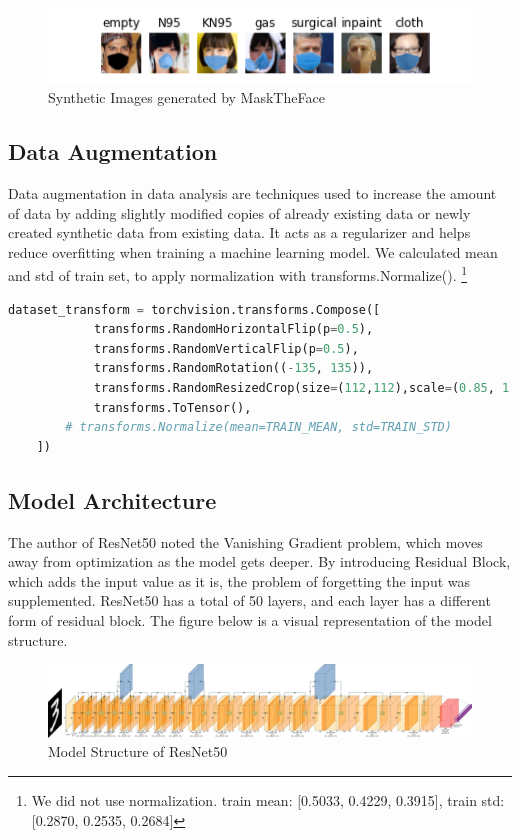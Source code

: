 \documentclass{article}
\begin{document}
\begin{figure}[H]
	\centering
	\includegraphics[scale=0.8]{images/mask_images.png}
	\caption{Synthetic Images generated by MaskTheFace}
\end{figure}

\subsection{Data Augmentation}
Data augmentation in data analysis are techniques used to increase the amount of data by adding slightly modified copies of already existing data or newly created synthetic data from existing data.
It acts as a regularizer and helps reduce overfitting when training a machine learning model. We calculated mean and std of train set, to apply normalization with transforms.Normalize().
\footnote[2] {We did not use normalization. train mean: [0.5033, 0.4229, 0.3915], train std: [0.2870, 0.2535, 0.2684]}

\begin{lstlisting}[language=Python]
    dataset_transform = torchvision.transforms.Compose([
            transforms.RandomHorizontalFlip(p=0.5),
            transforms.RandomVerticalFlip(p=0.5),
            transforms.RandomRotation((-135, 135)),
            transforms.RandomResizedCrop(size=(112,112),scale=(0.85, 1.0)),
            transforms.ToTensor(),
	    # transforms.Normalize(mean=TRAIN_MEAN, std=TRAIN_STD)
    ])
\end{lstlisting}

\subsection{Model Architecture}
The author of ResNet50 noted the Vanishing Gradient problem, which moves away from optimization as the model gets deeper.
By introducing Residual Block, which adds the input value as it is, the problem of forgetting the input was supplemented.
ResNet50 has a total of 50 layers, and each layer has a different form of residual block.
The figure below is a visual representation of the model structure.

\begin{figure}[H]
\centering
\includegraphics[scale=0.18]{images/resnet50_model.png}
\caption{Model Structure of ResNet50}

\end{figure}
\end{document}
